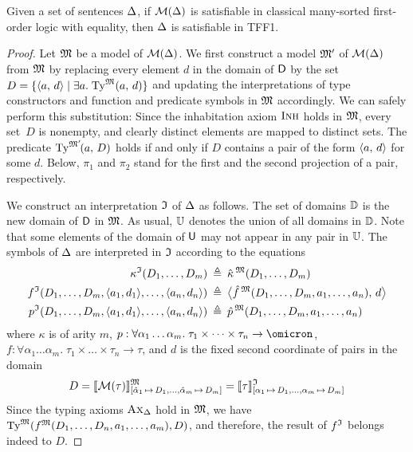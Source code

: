 \begin{theorem} \label{thm:mon_compl}
Given a set of sentences $\mathrm{\Delta}$, if $\mathcal{M}(\mathrm{\Delta})$
is satisfiable in classical many-sorted first-order logic
with equality, then $\mathrm{\Delta}$ is satisfiable in TFF1.
\end{theorem}
\begin{proof}
Let $\mathfrak{M}$ be a model of $\mathcal{M}(\mathrm{\Delta})$. We first construct a model $\mathfrak{M}'$ of $\mathcal{M}(\mathrm{\Delta})$
from $\mathfrak{M}$ by replacing every element $d$ in
the domain of $\mathsf{D}$ by the set $D = \{\langle a,\,d \rangle \mid \exists a.\; \mathrm{Ty}^{\mathfrak{M}}(a,\,d)\}$
and updating the interpretations of type constructors
and function and predicate symbols in $\mathfrak{M}$ accordingly.
We can safely perform this substitution: Since the inhabitation
axiom $\text{\sc Inh}$ holds in $\mathfrak{M}$, every set~$D$ is nonempty, and clearly distinct
elements are mapped to distinct sets.
The predicate $\mathrm{Ty}^{\mathfrak{M}'\!}(a,\,D)$ holds if and only if
$D$ contains a pair of the form $\langle a,\, d \rangle$ for some $d$.
%
Below, $\pi_1$ and $\pi_2$ stand for the first and the second projection
of a pair, respectively.

We construct an interpretation $\mathfrak{I}$ of $\mathrm{\Delta}$ as follows.
The set of domains $\mathbb{D}$ is the new domain
of $\mathsf{D}$ in $\mathfrak{M}$. As usual, $\mathbb{U}$ denotes the union
of all domains in $\mathbb{D}$. Note that some elements of
the domain of $\mathsf{U}$ may not appear in any pair in $\mathbb{U}$.
%
The symbols of $\mathrm{\Delta}$ are interpreted in $\mathfrak{I}$
according to the equations
\begin{align*}
\kappa^{\mathfrak{I}}(D_1,\dots,D_m) &\:\triangleq\: \hat{\kappa}{\,}^{\mathfrak{M}}(D_1,\dots,D_m) \\
f^{\mathfrak{I}}(D_1,\dots,D_m,\langle a_1,d_1 \rangle,\dots,\langle a_n,d_n \rangle) &\:\triangleq\:
\bigl\langle \hat{f}{\,}^{\mathfrak{M}}(D_1,\dots,D_m,a_1,\dots,a_n),\, d \bigr\rangle \\
p^{\mathfrak{I}}(D_1,\dots,D_m,\langle a_1,d_1 \rangle,\dots,\langle a_n,d_n \rangle) &\:\triangleq\:
\hat{p}{\,}^{\mathfrak{M}}(D_1,\dots,D_m,a_1,\dots,a_n)
\end{align*}
where
$\kappa$ is of arity $m$,
$p : \forall \alpha_1\dots\alpha_m .\; \tau_1 \times \dots \times \tau_n \to
\omicron$,
$f : \forall \alpha_1\dots\alpha_m .\; \tau_1 \times \dots \times \tau_n \to \tau$,
and $d$ is the fixed second coordinate of pairs in the domain
%
\[D = \llbracket \mathcal{M}(\tau) \rrbracket^{\mathfrak{M}}_{[\hat{\alpha}_1\,\mapsto\,D_1,\dots,
\hat{\alpha}_m\,\mapsto\,D_m]} =
\llbracket \tau \rrbracket^{\mathfrak{I}}_{[\alpha_1\,\mapsto\,D_1,\dots,\alpha_m\,\mapsto\,D_m]}\]%
%
Since the typing axioms $\text{\sc Ax}_{\mathrm{\Delta}}$ hold in $\mathfrak{M}$, we have
$\mathrm{Ty}^{\mathfrak{M}}(f^{\mathfrak{M}}(D_1,\dots,D_n,a_1,\dots,a_m), D)$,
and therefore, the result of $f^{\mathfrak{I}}$ belongs indeed to $D$.


\end{proof}
